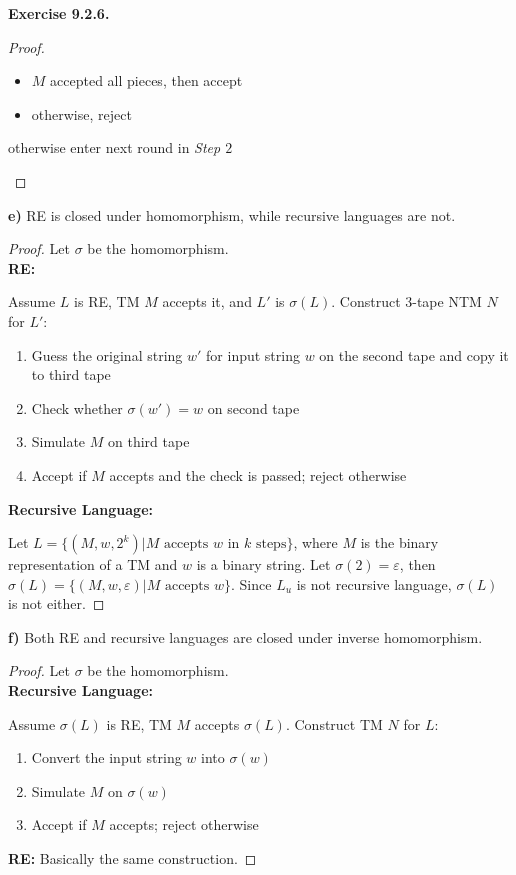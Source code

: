 \documentclass[a4paper]{article}
\newtheorem*{proof}{Proof}
\newenvironment{exercise}[1]{
	\par
	\noindent\textbf{Exercise #1.}\quad
}{
	\par
	\bigskip
}
\begin{document}
\begin{exercise}{9.2.6}
\begin{proof}
\begin{enumerate}
\begin{itemize}
                    \item $M$ accepted all pieces, then accept
                    \item otherwise, reject
                \end{itemize}
                otherwise enter next round in \textit{Step $2$}
        \end{enumerate}
    \end{proof}
\textbf{e)} RE is closed under homomorphism, while recursive languages are not.
    \begin{proof} Let $\sigma$ be the homomorphism.\\
        \textbf{RE:}\par
        Assume $L$ is RE, TM $M$ accepts it, and $L'$ is $\sigma(L)$.
        Construct $3$-tape NTM $N$ for $L'$:
        \begin{enumerate}
            \item Guess the original string $w'$ for input string $w$ on the second tape and copy it to third tape
            \item Check whether $\sigma(w')=w$ on second tape
            \item Simulate $M$ on third tape
            \item Accept if $M$ accepts and the check is passed; reject otherwise
        \end{enumerate}
        \textbf{Recursive Language:}\par
        Let $L=\{(M,w,2^k)|M\text{ accepts }w\text{ in $k$ steps}\}$, where $M$ is the binary representation of a TM
        and $w$ is a binary string. Let $\sigma(2)=\varepsilon$, then $\sigma(L)=\{(M,w,\varepsilon)|M\text{ accepts }w\}$.
        Since $L_u$ is not recursive language, $\sigma(L)$ is not either.
    \end{proof}
\textbf{f)} Both RE and recursive languages are closed under inverse homomorphism.
    \begin{proof} Let $\sigma$ be the homomorphism.\\
        \textbf{Recursive Language:}\par
        Assume $\sigma(L)$ is RE, TM $M$ accepts $\sigma(L)$. Construct TM $N$ for $L$:
        \begin{enumerate}
            \item Convert the input string $w$ into $\sigma(w)$
            \item Simulate $M$ on $\sigma(w)$
            \item Accept if $M$ accepts; reject otherwise
        \end{enumerate}
        \textbf{RE:} Basically the same construction.
    \end{proof}
\end{exercise}
\end{document}
